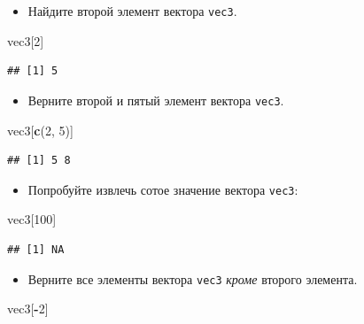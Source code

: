 \documentclass[]{book}
\newenvironment{Shaded}{\begin{snugshade}}{\end{snugshade}}
\newcommand{\KeywordTok}[1]{\textcolor[rgb]{0.13,0.29,0.53}{\textbf{#1}}}
\newcommand{\DecValTok}[1]{\textcolor[rgb]{0.00,0.00,0.81}{#1}}
\newcommand{\OperatorTok}[1]{\textcolor[rgb]{0.81,0.36,0.00}{\textbf{#1}}}
\newcommand{\NormalTok}[1]{#1}
\providecommand{\tightlist}{%
  \setlength{\itemsep}{0pt}\setlength{\parskip}{0pt}}
\begin{document}
\begin{itemize}
\tightlist
\item
  Найдите второй элемент вектора \texttt{vec3}.
\end{itemize}

\begin{Shaded}
\begin{Highlighting}[]
\NormalTok{vec3[}\DecValTok{2}\NormalTok{]}
\end{Highlighting}
\end{Shaded}

\begin{verbatim}
## [1] 5
\end{verbatim}

\begin{itemize}
\tightlist
\item
  Верните второй и пятый элемент вектора \texttt{vec3}.
\end{itemize}

\begin{Shaded}
\begin{Highlighting}[]
\NormalTok{vec3[}\KeywordTok{c}\NormalTok{(}\DecValTok{2}\NormalTok{, }\DecValTok{5}\NormalTok{)]}
\end{Highlighting}
\end{Shaded}

\begin{verbatim}
## [1] 5 8
\end{verbatim}

\begin{itemize}
\tightlist
\item
  Попробуйте извлечь сотое значение вектора \texttt{vec3}:
\end{itemize}

\begin{Shaded}
\begin{Highlighting}[]
\NormalTok{vec3[}\DecValTok{100}\NormalTok{]}
\end{Highlighting}
\end{Shaded}

\begin{verbatim}
## [1] NA
\end{verbatim}

\begin{itemize}
\tightlist
\item
  Верните все элементы вектора \texttt{vec3} \emph{кроме} второго
  элемента.
\end{itemize}

\begin{Shaded}
\begin{Highlighting}[]
\NormalTok{vec3[}\OperatorTok{-}\DecValTok{2}\NormalTok{]}
\end{Highlighting}
\end{Shaded}
\end{document}
